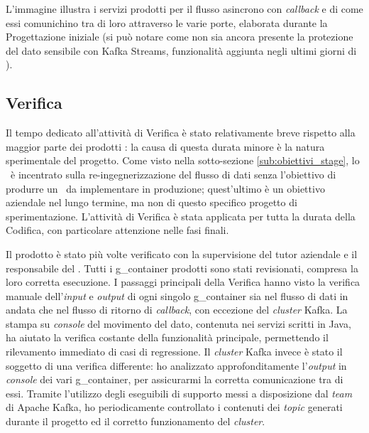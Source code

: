 L'immagine illustra i servizi prodotti per il flusso asincrono con \textit{callback} e di come essi comunichino tra di loro attraverso le varie porte, elaborata durante la Progettazione iniziale (si può notare come non sia ancora presente la protezione del dato sensibile con Kafka Streams, funzionalità aggiunta negli ultimi giorni di \stage).


\subsection{Verifica}


Il tempo dedicato all'attività di Verifica è stato relativamente breve rispetto alla maggior parte dei prodotti \software: la causa di questa durata minore è la natura sperimentale del progetto.
Come visto nella sotto-sezione \ref{sub:obiettivi_stage}, lo \stage\ è incentrato sulla re-ingegnerizzazione del flusso di dati senza l'obiettivo di produrre un \middleware\ da implementare in produzione; quest'ultimo è un obiettivo aziendale nel lungo termine, ma non di questo specifico progetto di sperimentazione.
L'attività di Verifica è stata applicata per tutta la durata della Codifica, con particolare attenzione nelle fasi finali.

Il prodotto è stato più volte verificato con la supervisione del tutor aziendale e il responsabile del .
Tutti i \gls{g_container} prodotti sono stati revisionati, compresa la loro corretta esecuzione.
I passaggi principali della Verifica hanno visto la verifica manuale dell'\textit{input} e \textit{output} di ogni singolo \gls{g_container} sia nel flusso di dati in andata che nel flusso di ritorno di \textit{callback}, con eccezione del \textit{cluster} Kafka.
La stampa su \textit{console} del movimento del dato, contenuta nei servizi scritti in Java, ha aiutato la verifica costante della funzionalità principale, permettendo il rilevamento immediato di casi di regressione.
Il \textit{cluster} Kafka invece è stato il soggetto di una verifica differente: ho analizzato approfonditamente l'\textit{output} in \textit{console} dei vari \gls{g_container}, per assicurarmi la corretta comunicazione tra di essi.
Tramite l'utilizzo degli eseguibili di supporto messi a disposizione dal \textit{team} di Apache Kafka, ho periodicamente controllato i contenuti dei \textit{topic} generati durante il progetto ed il corretto funzionamento del \textit{cluster}.



